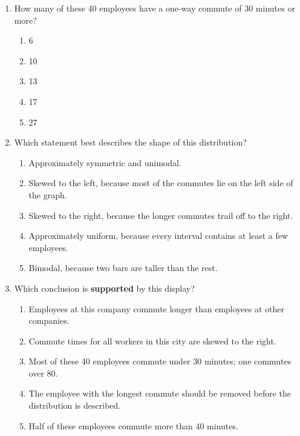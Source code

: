 \documentclass[12pt]{article}
\begin{document}
\vspace{0.10in}

\begin{enumerate}[leftmargin=1.9em, itemsep=0.11in]

  \item How many of these 40 employees have a one-way commute of 30 minutes or more?
        \begin{enumerate}[label=\textbf{(\Alph*)}, leftmargin=2.2em, itemsep=2pt]
          \item 6
          \item 10
          \item 13
          \item 17
          \item 27
                \hfill{}
        \end{enumerate}

  \item Which statement best describes the shape of this distribution?
        \begin{enumerate}[label=\textbf{(\Alph*)}, leftmargin=2.2em, itemsep=2pt]
          \item Approximately symmetric and unimodal.
          \item Skewed to the left, because most of the commutes lie on the left side of the
                graph.
          \item Skewed to the right, because the longer commutes trail off to the right.
          \item Approximately uniform, because every interval contains at least a few employees.
          \item Bimodal, because two bars are taller than the rest.
                \hfill{}
        \end{enumerate}

  \boxguard[10]
  \item Which conclusion is \textbf{supported} by this display?
        \begin{enumerate}[label=\textbf{(\Alph*)}, leftmargin=2.2em, itemsep=2pt]
          \item Employees at this company commute longer than employees at other companies.
          \item Commute times for all workers in this city are skewed to the right.
          \item Most of these 40 employees commute under 30 minutes; one commutes over 80.
          \item The employee with the longest commute should be removed before the distribution
                is described.
          \item Half of these employees commute more than 40 minutes.
                \hfill{}
        \end{enumerate}


\end{enumerate}
\end{document}
